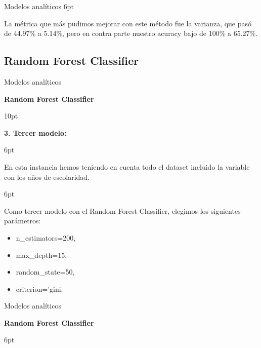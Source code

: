 \documentclass[pdf]{beamer}
\def\vspace{}%
\begin{document}
{\begin{frame}{Modelos analíticos}
\vspace{6pt}
    
    La métrica que más pudimos mejorar con este método fue la varianza, que pasó de 44.97\% a 5.14\%, pero en contra parte nuestro acuracy bajo de 100\% a 65.27\%.

\end{frame}

    \subsection{Random Forest Classifier}

\begin{frame}{Modelos analíticos}

    
    \begin{Large}
        \textbf{Random Forest Classifier}
    \end{Large}

\vspace{10pt}

    \textbf{3. Tercer modelo:}
    
\vspace{6pt}

    En esta instancia hemos teniendo en cuenta todo el dataset incluido la variable con los años de escolaridad. 
    
\vspace{6pt}

    Como tercer modelo con el Random Forest Classifier, elegimos los siguientes parámetros:
    \begin{itemize}
        \item n\_estimators=200,
        \item max\_depth=15,
        \item random\_state=50,
        \item criterion='gini.
    \end{itemize}

\end{frame}

\begin{frame}{Modelos analíticos}

    \begin{Large}
        \textbf{Random Forest Classifier}
    \end{Large}
\vspace{6pt}
    

\end{frame}}
\end{document}
